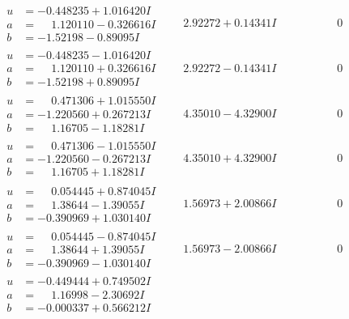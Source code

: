 \documentclass[1p]{elsarticle_modified}
\theoremstyle{definition}
\begin{document}
$$\begin{array}{c|c|c}
\begin{aligned}
u &= -0.448235 + 1.016420 I \\
a &= \phantom{-}1.120110 - 0.326616 I \\
b &= -1.52198 - 0.89095 I\end{aligned}
 & \phantom{-}2.92272 + 0.14341 I & \phantom{-0.000000 } 0 \\ \hline\begin{aligned}
u &= -0.448235 - 1.016420 I \\
a &= \phantom{-}1.120110 + 0.326616 I \\
b &= -1.52198 + 0.89095 I\end{aligned}
 & \phantom{-}2.92272 - 0.14341 I & \phantom{-0.000000 } 0 \\ \hline\begin{aligned}
u &= \phantom{-}0.471306 + 1.015550 I \\
a &= -1.220560 + 0.267213 I \\
b &= \phantom{-}1.16705 - 1.18281 I\end{aligned}
 & \phantom{-}4.35010 - 4.32900 I & \phantom{-0.000000 } 0 \\ \hline\begin{aligned}
u &= \phantom{-}0.471306 - 1.015550 I \\
a &= -1.220560 - 0.267213 I \\
b &= \phantom{-}1.16705 + 1.18281 I\end{aligned}
 & \phantom{-}4.35010 + 4.32900 I & \phantom{-0.000000 } 0 \\ \hline\begin{aligned}
u &= \phantom{-}0.054445 + 0.874045 I \\
a &= \phantom{-}1.38644 - 1.39055 I \\
b &= -0.390969 + 1.030140 I\end{aligned}
 & \phantom{-}1.56973 + 2.00866 I & \phantom{-0.000000 } 0 \\ \hline\begin{aligned}
u &= \phantom{-}0.054445 - 0.874045 I \\
a &= \phantom{-}1.38644 + 1.39055 I \\
b &= -0.390969 - 1.030140 I\end{aligned}
 & \phantom{-}1.56973 - 2.00866 I & \phantom{-0.000000 } 0 \\ \hline\begin{aligned}
u &= -0.449444 + 0.749502 I \\
a &= \phantom{-}1.16998 - 2.30692 I \\
b &= -0.000337 + 0.566212 I\end{aligned}

\end{array}$$
\end{document}
